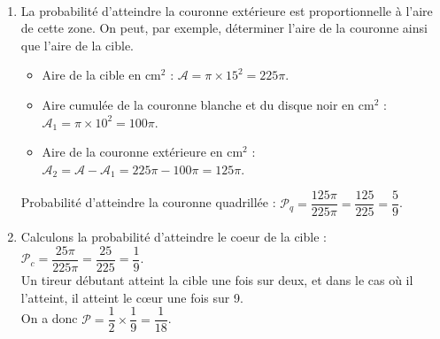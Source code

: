 \ \\ [-5mm]
   \begin{enumerate}
      \item La probabilité d'atteindre la couronne extérieure est proportionnelle à l'aire de cette zone. On peut, par exemple, déterminer l'aire de la couronne ainsi que l'aire de la cible.
      \begin{itemize}
         \item Aire de la cible en cm$^2$ : $\mathcal{A} =\pi\times15^2 =225\pi$.
         \item Aire cumulée de la couronne blanche et du disque noir en cm$^2$ : $\mathcal{A}_1 =\pi\times10^2 =100\pi$.
         \item Aire de la couronne extérieure en cm$^2$ : $\mathcal{A}_2 =\mathcal{A} -\mathcal{A}_1 =225\pi-100\pi =125\pi$.
      \end{itemize}
      \smallskip
      Probabilité d'atteindre la couronne quadrillée : $\mathcal{P}_q =\dfrac{125\pi}{225\pi} =\dfrac{125}{225} =\dfrac59$. \\ [1mm]
      \item Calculons la probabilité d'atteindre le coeur de la cible : $\mathcal{P}_c =\dfrac{25\pi}{225\pi} =\dfrac{25}{225} =\dfrac19$. \\ [5pt]
      Un tireur débutant atteint la cible une fois sur deux, et dans le cas où il l'atteint, il atteint le c\oe ur une fois sur 9. \\
      On a donc $\mathcal{P} =\dfrac12\times\dfrac19 =\dfrac{1}{18}$. \\
   \end{enumerate}
